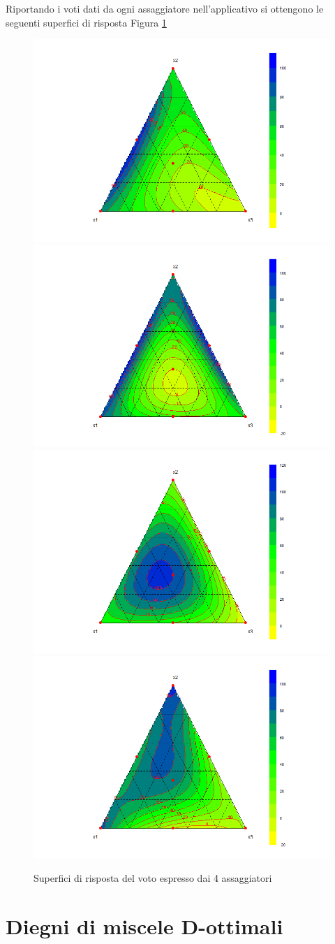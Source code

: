 \documentclass[
  11pt,
]{book}
\begin{document}
Riportando i voti dati da ogni assaggiatore nell'applicativo si ottengono le seguenti superfici di risposta Figura \ref{fig:mixfig8}

\begin{figure}[ht]
\includegraphics[width=0.5\linewidth]{Immagini/Mixt/08_aceR} \includegraphics[width=0.5\linewidth]{Immagini/Mixt/09_aceP} \includegraphics[width=0.5\linewidth]{Immagini/Mixt/10_aceM} \includegraphics[width=0.5\linewidth]{Immagini/Mixt/11_aceD} \caption{Superfici di risposta del voto espresso dai 4 assaggiatori}\label{fig:mixfig8}
\end{figure}

\newpage

\hypertarget{diegni-di-miscele-d-ottimali}{%
\section{Diegni di miscele D-ottimali}\label{diegni-di-miscele-d-ottimali}}
\end{document}
